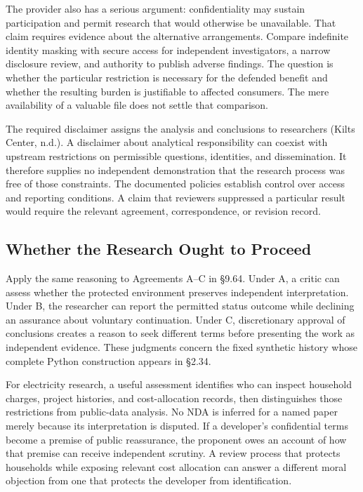 The provider also has a serious argument: confidentiality may sustain
participation and permit research that would otherwise be unavailable.
That claim requires evidence about the alternative arrangements. Compare
indefinite identity masking with secure access for independent
investigators, a narrow disclosure review, and authority to publish
adverse findings. The question is whether the particular restriction is
necessary for the defended benefit and whether the resulting burden is
justifiable to affected consumers. The mere availability of a valuable
file does not settle that comparison.

The required disclaimer assigns the analysis and conclusions to
researchers (Kilts Center, n.d.). A disclaimer about analytical
responsibility can coexist with upstream restrictions on permissible
questions, identities, and dissemination. It therefore supplies no
independent demonstration that the research process was free of those
constraints. The documented policies establish control over access and
reporting conditions. A claim that reviewers suppressed a particular
result would require the relevant agreement, correspondence, or revision
record.

\hypertarget{M09-whether-the-research-ought-to-proceed}{%
\subsection{Whether the Research Ought to
Proceed}\label{M09-whether-the-research-ought-to-proceed}}

\noindent \noindent Apply the same reasoning to Agreements A--C in §9.64. Under A,
a critic can assess whether the protected environment preserves
independent interpretation. Under B, the researcher can report the
permitted status outcome while declining an assurance about voluntary
continuation. Under C, discretionary approval of conclusions creates a
reason to seek different terms before presenting the work as independent
evidence. These judgments concern the fixed synthetic history whose
complete Python construction appears in §2.34.

For electricity research, a useful assessment identifies who can inspect
household charges, project histories, and cost-allocation records, then
distinguishes those restrictions from public-data analysis. No NDA is
inferred for a named paper merely because its interpretation is
disputed. If a developer's confidential terms become a premise of public
reassurance, the proponent owes an account of how that premise can
receive independent scrutiny. A review process that protects households
while exposing relevant cost allocation can answer a different moral
objection from one that protects the developer from identification.

